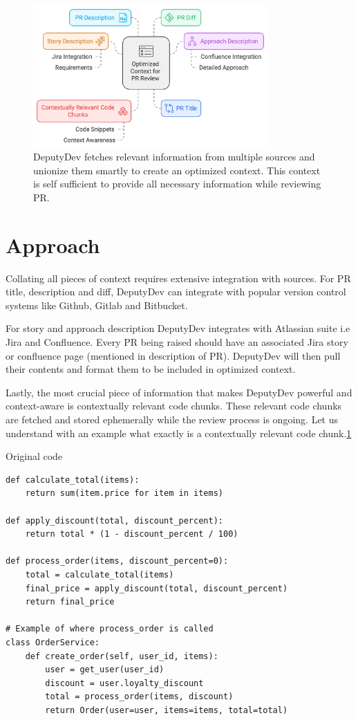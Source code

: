 \begin{figure}[htbp]
    \centering
    \includegraphics[width=0.8\textwidth]
    {Figures/context_creation.png}
    \caption{DeputyDev fetches relevant information from multiple sources and unionize them smartly to create an optimized context. This context is self sufficient to provide all necessary information while reviewing PR.}
    \label{fig:context-creation}
\end{figure}

\section{Approach}
Collating all pieces of context requires extensive integration with sources. For PR title, description and diff, DeputyDev can integrate with popular version control systems like Github, Gitlab and Bitbucket.

For story and approach description DeputyDev integrates with Atlassian suite i.e Jira and Confluence. Every PR being raised should have an associated Jira story or confluence page (mentioned in description of PR). DeputyDev will then pull their contents and format them to be included in optimized context.

Lastly, the most crucial piece of information that makes DeputyDev powerful and context-aware is contextually relevant code chunks. These relevant code chunks are fetched and stored ephemerally while the review process is ongoing. Let us understand with an example what exactly is a contextually relevant code chunk.\ref{fig:context-creation}


Original code
\begin{lstlisting}
def calculate_total(items):
    return sum(item.price for item in items)

def apply_discount(total, discount_percent):
    return total * (1 - discount_percent / 100)

def process_order(items, discount_percent=0):
    total = calculate_total(items)
    final_price = apply_discount(total, discount_percent)
    return final_price

# Example of where process_order is called
class OrderService:
    def create_order(self, user_id, items):
        user = get_user(user_id)
        discount = user.loyalty_discount
        total = process_order(items, discount)
        return Order(user=user, items=items, total=total)
\end{lstlisting}

